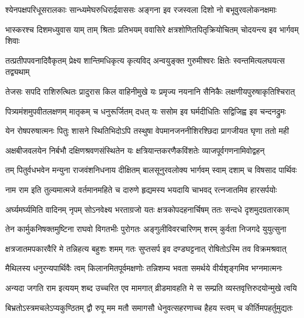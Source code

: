 \fourlineindentedshloka
{श्येनपक्षपरिधूसरालकाः}
{सान्ध्यमेघरुधिरार्द्रवाससः}
{अङ्गना इव रजस्वला दिशो}
{नो बभूवुरवलोकनक्षमाः} %

\fourlineindentedshloka
{भास्करश्च दिशमध्युवास याम्}
{ताम् श्रिताः प्रतिभयम् ववासिरे}
{क्षत्रशोणितपितृक्रियोचितम्}
{चोदयन्त्य इव भार्गवम् शिवाः} %

\fourlineindentedshloka
{तत्प्रतीपपवनादिवैकृतम्}
{प्रेक्ष्य शान्तिमधिकृत्य कृत्यविद्}
{अन्वयुङ्क्त गुरुमीश्वरः क्षितेः}
{स्वन्तमित्यलघयत्स तद्व्यथाम्} %

\fourlineindentedshloka
{तेजसः सपदि राशिरुत्थितः}
{प्रादुरास किल वाहिनीमुखे}
{यः प्रमृज्य नयनानि सैनिकैः}
{लक्षणीयपुरुषाकृतिश्चिरात्} %

\fourlineindentedshloka
{पित्र्यमंशमुपवीतलक्षणम्}
{मातृकम् च धनुरूर्जितम् दधत्}
{यः ससोम इव घर्मदीधितिः}
{सद्विजिह्व इव चन्दनद्रुमः} %

\fourlineindentedshloka
{येन रोषपरुषात्मनः पितुः}
{शासने स्थितिभिदोऽपि तस्थुषा}
{वेपमानजननीशिरश्छिदा}
{प्रागजीयत घृणा ततो मही} %

\fourlineindentedshloka
{अक्षबीजवलयेन निर्बभौ}
{दक्षिणश्रवणसंस्थितेन यः}
{क्षत्रियान्तकरणैकविंशतेः}
{व्याजपूर्वगणनामिवोद्वहन्} %

\fourlineindentedshloka
{तम् पितुर्वधभवेन मन्युना}
{राजवंशनिधनाय दीक्षितम्}
{बालसूनुरवलोक्य भार्गवम्}
{स्वाम् दशाम् च विषसाद पार्थिवः} %

\fourlineindentedshloka
{नाम राम इति तुल्यमात्मजे}
{वर्तमानमहिते च दारुणे}
{हृद्यमस्य भयदायि चाभवद्}
{रत्नजातमिव हारसर्पयोः} %

\fourlineindentedshloka
{अर्घ्यमर्घ्यमिति वादिनम् नृपम्}
{सोऽनवेक्ष्य भरताग्रजो यतः}
{क्षत्रकोपदहनार्चिषम् ततः}
{सन्दधे दृशमुदग्रतारकाम्} %

\fourlineindentedshloka
{तेन कार्मुकनिषक्तमुष्टिना}
{राघवो विगतभीः पुरोगतः}
{अङ्गुलीविवरचारिणम् शरम्}
{कुर्वता निजगदे युयुत्सुना} %

\fourlineindentedshloka
{क्षत्रजातमपकारवैरि मे}
{तन्निहत्य बहुशः शमम् गतः}
{सुप्तसर्प इव दण्डघट्टनात्}
{रोषितोऽस्मि तव विक्रमश्रवात्} %

\fourlineindentedshloka
{मैथिलस्य धनुरन्यपार्थिवैः}
{त्वम् किलानमितपूर्वमक्षणोः}
{तन्निशम्य भवता समर्थये}
{वीर्यशृङ्गमिव भग्नमात्मनः} %

\fourlineindentedshloka
{अन्यदा जगति राम इत्ययम्}
{शब्द उच्चरित एव मामगात्}
{व्रीडमावहति मे स सम्प्रति}
{व्यस्तवृत्तिरुदयोन्मुखे त्वयि} %

\fourlineindentedshloka
{बिभ्रतोऽस्त्रमचलेऽप्यकुण्ठितम्}
{द्वौ रुपू मम मतौ समागसौ}
{धेनुवत्सहरणाच्च हैहय}
{स्त्वम् च कीर्तिमपहर्तुमुद्यतः} %


